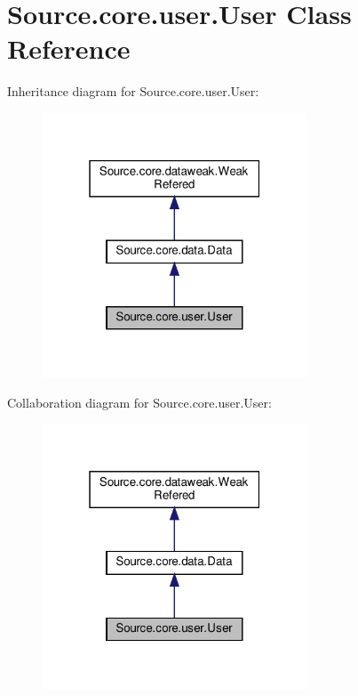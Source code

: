 \hypertarget{classSource_1_1core_1_1user_1_1User}{}\section{Source.\+core.\+user.\+User Class Reference}
\label{classSource_1_1core_1_1user_1_1User}


Inheritance diagram for Source.\+core.\+user.\+User\+:\nopagebreak
\begin{figure}[H]
\begin{center}
\leavevmode
\includegraphics[width=223pt]{classSource_1_1core_1_1user_1_1User__inherit__graph}
\end{center}
\end{figure}


Collaboration diagram for Source.\+core.\+user.\+User\+:\nopagebreak
\begin{figure}[H]
\begin{center}
\leavevmode
\includegraphics[width=223pt]{classSource_1_1core_1_1user_1_1User__coll__graph}
\end{center}
\end{figure}
